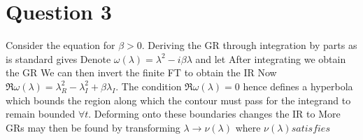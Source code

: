 \documentclass{article}
\begin{document}
\section{Question 3}
Consider the equation 
for $\beta > 0$. Deriving the GR through integration by parts as is standard gives 
Denote $\omega(\lambda) = \lambda^2 -i\beta\lambda$ and let 
After integrating we obtain the GR
We can then invert the finite FT to obtain the IR 
Now $\Re \omega(\lambda) = \lambda_R^2 - \lambda_I^2 + \beta\lambda_I$. The condition $\Re \omega(\lambda) = 0$ hence defines a hyperbola which bounds the region along which the contour must pass for the integrand to remain bounded $\forall t$. Deforming onto these boundaries changes the IR to 
More GRs may then be found by transforming $\lambda \to \nu(\lambda)$ where $\nu(\lambda) satisfies $
\end{document}
